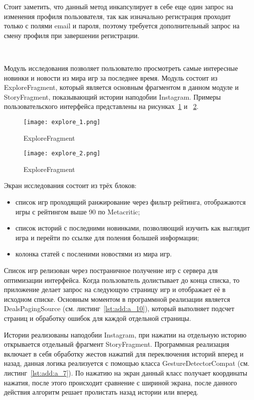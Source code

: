 Стоит заметить, что данный метод инкапсулирует в себе еще один запрос на изменения профиля пользователя, так как изначально регистрация проходит только с полями email и пароля, поэтому требуется дополнительный запрос на смену профиля при завершении регистрации.

~\par
Модуль исследования позволяет пользователю просмотреть самые интересные новинки и новости из мира игр за последнее время. Модуль состоит из ExploreFragment, который является основным фрагментом в данном модуле и StoryFragment, показывающий истории наподобии Instagram. Примеры пользовательского интерфейса представлены на рисунках~\ref{fig:arch:explore_1} и ~\ref{fig:arch:explore_2}.

\begin{figure}[H]
 \centering
   \texttt{[image: explore\_1.png]} 
   \caption{ExploreFragment}
   \label{fig:arch:explore_1}
\end{figure}

\begin{figure}[H]
 \centering
   \texttt{[image: explore\_2.png]} 
   \caption{ExploreFragment}
   \label{fig:arch:explore_2}
\end{figure}

Экран исследования состоит из трёх блоков:

\begin{itemize}
  \item список игр проходящий ранжирование через фильтр рейтинга, отображаются игры с рейтингом выше 90 по Metacritic;
  \item список историй с последними новинками, позволяющий изучить как выглядит игра и перейти по ссылке для поления большей информации;
  \item колонка статей с посленими новостями из мира игр.
\end{itemize}

Список игр релизован через постраничное получение игр с сервера для оптимизации интерфейса. Когда пользователь долистывает до конца списка, то приложение делает запрос на следующую страницу игр и отображает её в исходном списке. Основным моментом в программной реализации является DealsPagingSource (см. листинг~\ref{lst:add:a_10}), который выполняет подсчет страниц и обработку ошибок для каждой отдельной страницы.

Истории реализованы наподобии Instagram, при нажатии на отдельную историю открывается отдельный фрагмент StoryFragment. Программная реализация включает в себя обработку жестов нажатий для переключения историй вперед и назад, данная логика реализуется с помощью класса GestureDetectorCompat (см. листинг~\ref{lst:add:a_7}). По нажатию на экран данный класс получает координаты нажатия, после этого происходит сравнение с шириной экрана, после данного действия алгоритм решает пролистать назад истории или вперед.

